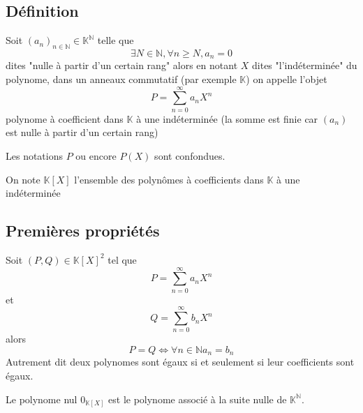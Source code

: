 \documentclass[11pt,colorlinks]{book}
\theoremstyle{mytheoremstyle}
\theoremstyle{mytheoremstyle}
\theoremstyle{mytheoremstyle}
\theoremstyle{mytheoremstyle}
\theoremstyle{mytheoremstyle}
\theoremstyle{mytheoremstyle}
\theoremstyle{mytheoremstyle}
\theoremstyle{mytheoremstyle}
\theoremstyle{myproblemstyle}
\def\mbb#1{\mathbb{#1}}
\def\bN{\mbb{N}}
\def\bK{\mbb{K}}
\def\apcr{à partir d'un certain rang}
\begin{document}
\subsection{Définition}
\begin{definition}
  Soit $(a_n)_{n \in \bN} \in \bK^{\bN}$ telle que
  \begin{equation*}
    \exists N \in \bN, \forall n \geq N, a_n = 0
  \end{equation*}
  dites "nulle \apcr" alors en notant $X$ dites "l'indéterminée" du polynome, dans un anneaux commutatif (par exemple $\bK$) on appelle l'objet
  \begin{equation*}
    P = \sum_{n=0}^{\infty} a_n X^n
  \end{equation*}
  polynome à coefficient dans $\bK$ à une indéterminée (la somme est finie car $(a_n)$ est nulle \apcr)
\end{definition}
\begin{rmq}
  Les notations $P$ ou encore $P(X)$ sont confondues.
\end{rmq}
\begin{definition}
  On note $\bK[X]$ l'ensemble des polynômes à coefficients dans $\bK$ à une indéterminée
\end{definition}
\subsection{Premières propriétés}
\begin{definition}[Égalité]
  Soit $(P,Q) \in \bK[X]^2$ tel que 
  \begin{equation*}
    P = \sum_{n=0}^{\infty} a_n X^n
  \end{equation*} et 
  \begin{equation*}
    Q = \sum_{n=0}^{\infty} b_n X^n
  \end{equation*} alors 
  \begin{equation*}
    P = Q \Leftrightarrow \forall n \in \bN a_n = b_n
  \end{equation*}
  Autrement dit deux polynomes sont égaux si et seulement si leur coefficients sont égaux.
\end{definition}
\begin{definition}
  Le polynome nul $0_{\bK[X]}$ est le polynome associé à la suite nulle de $\bK^{\bN}$.
\end{definition}
\end{document}
